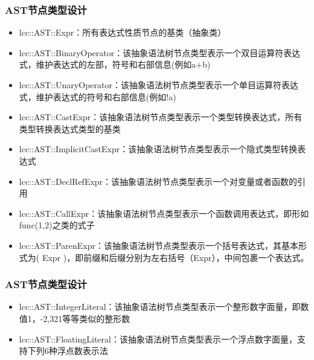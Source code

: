 \begin{frame}
    \frametitle{AST节点类型设计}
    \footnotesize
    \begin{itemize}
        \item {lcc::AST::Expr：所有表达式性质节点的基类（抽象类）}
        \item {lcc::AST::BinaryOperator：该抽象语法树节点类型表示一个双目运算符表达式，维护表达式的左部，符号和右部信息(例如a+b)}
        \item {lcc::AST::UnaryOperator：该抽象语法树节点类型表示一个单目运算符表达式，维护表达式的符号和右部信息(例如!a)}
        \item {lcc::AST::CastExpr：该抽象语法树节点类型表示一个类型转换表达式，所有类型转换表达式类型的基类}
        \item {lcc::AST::ImplicitCastExpr：该抽象语法树节点类型表示一个隐式类型转换表达式}
        \item {lcc::AST::DeclRefExpr：该抽象语法树节点类型表示一个对变量或者函数的引用}
        \item {lcc::AST::CallExpr：该抽象语法树节点类型表示一个函数调用表达式，即形如func(1,2)之类的式子}
        \item {lcc::AST::ParenExpr：该抽象语法树节点类型表示一个括号表达式，其基本形式为( Expr )，即前缀和后缀分别为左右括号（Expr），中间包裹一个表达式。}
    \end{itemize}
\end{frame}

\begin{frame}
    \frametitle{AST节点类型设计}
    \footnotesize
    \begin{itemize}
        \item {lcc::AST::IntegerLiteral：该抽象语法树节点类型表示一个整形数字面量，即数值1，-2,321等等类似的整形数}
        \item {lcc::AST::FloatingLiteral：该抽象语法树节点类型表示一个浮点数字面量，支持下列6种浮点数表示法}
    \end{itemize}
\end{frame}

